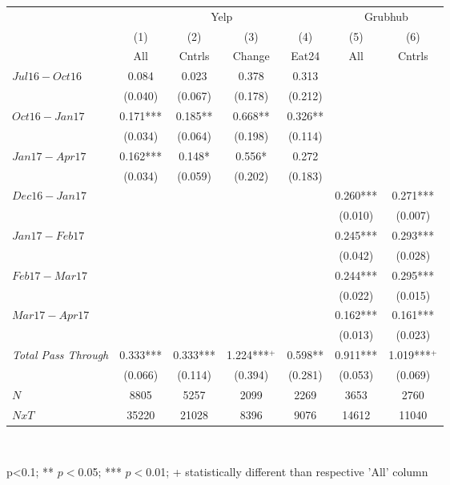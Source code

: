 \begin{center}
\begin{tabular}{lcccccc}
\hline  & \multicolumn{4}{c}{Yelp} & \multicolumn{2}{c}{Grubhub}\\
 & (1) & (2) & (3) & (4) & (5) & (6)\\
 & All & Cntrls & Change & Eat24 & All & Cntrls\\
\hline  $ Jul16-Oct16 $  & 0.084 & 0.023 & 0.378 & 0.313 &  & \\
 & (0.040) & (0.067) & (0.178) & (0.212) &  & \\
 $ Oct16-Jan17 $  & 0.171*** & 0.185** & 0.668** & 0.326** &  & \\
 & (0.034) & (0.064) & (0.198) & (0.114) &  & \\
 $ Jan17-Apr17 $  & 0.162*** & 0.148* & 0.556* & 0.272 &  & \\
 & (0.034) & (0.059) & (0.202) & (0.183) &  & \\
\hline  $ Dec16-Jan17 $  &  &  &  &  & 0.260*** & 0.271***\\
 &  &  &  &  & (0.010) & (0.007)\\
 $ Jan17-Feb17 $  &  &  &  &  & 0.245*** & 0.293***\\
 &  &  &  &  & (0.042) & (0.028)\\
 $ Feb17-Mar17 $  &  &  &  &  & 0.244*** & 0.295***\\
 &  &  &  &  & (0.022) & (0.015)\\
 $ Mar17-Apr17 $  &  &  &  &  & 0.162*** & 0.161***\\
 &  &  &  &  & (0.013) & (0.023)\\
\hline \textit{Total Pass Through} & 0.333*** & 0.333*** & 1.224***$^+$ & 0.598** & 0.911*** & 1.019***$^+$\\
  & (0.066) & (0.114) & (0.394) & (0.281) & (0.053) & (0.069)\\
\hline  $ N $  & 8805 & 5257 & 2099 & 2269 & 3653 & 2760\\
 $ NxT $  & 35220 & 21028 & 8396 & 9076 & 14612 & 11040\\
\hline\end{tabular}\\
\begin{tiny}p<0.1; ** $p<0$.05; *** $p<0$.01; + statistically different than respective 'All' column \end{tiny}\\
\end{center}
